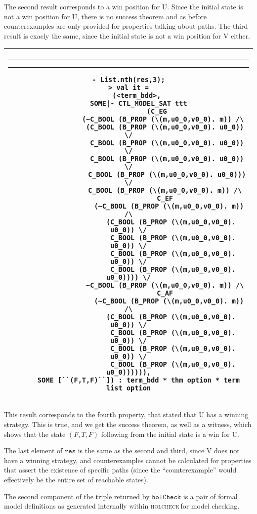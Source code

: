 \documentclass{article}
\makeatletter
\newcommand{\hc}{\textsc{holcheck\,}}
\newlength{\hsbw}
\newcounter{sessioncount}
\newcommand\MLSpacing{13pt}
\newenvironment{session}{\begin{flushleft}
 \begin{tabular}{@{}|c@{}|@{}}\hline 
 \begin{minipage}[b]{\hsbw}
 \vspace*{-.5pt}
 \begin{flushright}
 \rule{0.01in}{.15in}\rule{0.3in}{0.01in}\hspace{-0.35in}
 \raisebox{0.04in}{\makebox[0.3in][c]{\footnotesize\sl \thesessioncount}}
 \end{flushright}
 \vspace*{-.45in}
 \begingroup\small\baselineskip\MLSpacing}{\endgroup\end{minipage}\\ \hline 
 \end{tabular}
 \end{flushleft}
 \stepcounter{sessioncount}}
\makeatother
\begin{document}
The second result corresponds to a win position for U. Since the initial state is not a win position for U, there is no success theorem and as before counterexamples are only provided for properties talking about paths. The third result is exacly the same, since the initial state is not a win position for V either.
 
\begin{session}\begin{verbatim}
- List.nth(res,3);
> val it =
    (<term_bdd>,
     SOME|- CTL_MODEL_SAT ttt
              (C_EG
                 (~C_BOOL (B_PROP (\(m,u0_0,v0_0). m)) /\
                  (C_BOOL (B_PROP (\(m,u0_0,v0_0). u0_0)) \/
                   C_BOOL (B_PROP (\(m,u0_0,v0_0). u0_0)) \/
                   C_BOOL (B_PROP (\(m,u0_0,v0_0). u0_0)) \/
                   C_BOOL (B_PROP (\(m,u0_0,v0_0). u0_0))) \/
                  C_BOOL (B_PROP (\(m,u0_0,v0_0). m)) /\
                  C_EF
                    (~C_BOOL (B_PROP (\(m,u0_0,v0_0). m)) /\
                     (C_BOOL (B_PROP (\(m,u0_0,v0_0). u0_0)) \/
                      C_BOOL (B_PROP (\(m,u0_0,v0_0). u0_0)) \/
                      C_BOOL (B_PROP (\(m,u0_0,v0_0). u0_0)) \/
                      C_BOOL (B_PROP (\(m,u0_0,v0_0). u0_0)))) \/
                  ~C_BOOL (B_PROP (\(m,u0_0,v0_0). m)) /\
                  C_AF
                    (~C_BOOL (B_PROP (\(m,u0_0,v0_0). m)) /\
                     (C_BOOL (B_PROP (\(m,u0_0,v0_0). u0_0)) \/
                      C_BOOL (B_PROP (\(m,u0_0,v0_0). u0_0)) \/
                      C_BOOL (B_PROP (\(m,u0_0,v0_0). u0_0)) \/
                      C_BOOL (B_PROP (\(m,u0_0,v0_0). u0_0)))))),
     SOME [``(F,T,F)``]) : term_bdd * thm option * term list option
\end{verbatim}\end{session}

This result corresponds to the fourth property, that stated that U has a winning strategy. This is true, and we get the success theorem, as well as a witness, which shows that the state \((F,T,F)\) following from the initial state is a win for U. 

The last element of \(\mathtt{res}\) is the same as the second and third, since V does not have a winning strategy, and counterexamples cannot be calculated for properties that assert the existence of specific paths (since the ``counterexample'' would effectively be the entire set of reachable states).

The second component of the triple returned by \(\mathtt{holCheck}\) is a pair of formal model definitions as generated internally within \hc for model checking. 
\end{document}

